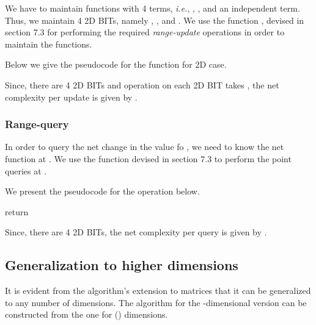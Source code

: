 \documentclass[a4paper]{article}
\begin{document}
We have to maintain functions with 4 terms, \textit{i.e.}, , ,  and an independent term. Thus, we maintain 4 2D BITs, namely , ,  and . We use the function , devised in section 7.3 for performing the required \textit{range-update} operations in order to maintain the functions.

\vspace{2 mm}
Below we give the pseudocode for the  function for 2D case.

\vspace {3 mm}
\noindent
{}
\begin{algorithmic}[1]

        \State 
        
        \State 
        \State 
        
        \State 
        \State 
        
        \State 
        \State 
        \State 
        \State 
\EndFunction
\end{algorithmic}

\vspace{3 mm}
Since, there are 4 2D BITs and operation on each 2D BIT takes , the net complexity per update is given by .




\subsubsection{Range-query}
In order to query the net change in the value fo , we need to know the net function at . We use the  function devised in section 7.3 to perform the point queries at .

\vspace{2 mm}
We present the pseudocode for the  operation below.

\vspace {3 mm}
\noindent
{}
\begin{algorithmic}[1]

        \State 
        \State 
        \State 
        \State 
        \State return 
\EndFunction
\end{algorithmic}

\vspace{3 mm}
Since, there are 4 2D BITs, the net complexity per query is given by .



\subsection{Generalization to higher dimensions}
It is evident from the algorithm's extension to matrices that it can be generalized to any number of dimensions. The algorithm for the -dimensional version can be constructed from the one for () dimensions.
\end{document}
